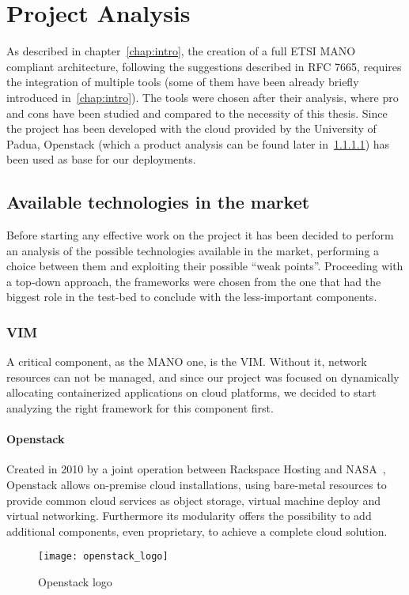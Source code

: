 \chapter{Project Analysis}
\label{chap:prjan}

As described in chapter~\ref{chap:intro}, the creation of a full ETSI MANO
compliant architecture, following the suggestions described in RFC 7665,
requires the integration of multiple tools (some of them have been already
briefly introduced in~\ref{chap:intro}). The tools were chosen after their
analysis, where pro and cons have been studied and compared to the necessity of
this thesis. Since the project has been developed with the cloud provided by the
University of Padua, Openstack (which a product analysis can be found later
in~\ref{chap:prjan:sec:openstack}) has been used as base for our deployments.

\section{Available technologies in the market}
\label{chap:prjan:sec:tech}
Before starting any effective work on the project it has been decided to 
perform an analysis of the possible technologies available in the market, 
performing a choice between them and exploiting their possible ``weak 
points''. Proceeding with a top-down approach, the frameworks were chosen from 
the one that had the biggest role in the test-bed to conclude with the 
less-important components.
\subsection{VIM}
A critical component, as the MANO one, is the VIM. Without it, network resources
can not be managed, and since our project was focused on dynamically allocating
containerized applications on cloud platforms, we decided to start analyzing the
right framework for this component first.

\subsubsection{Openstack}
\label{chap:prjan:sec:openstack}
Created in 2010 by a joint operation between Rackspace Hosting and
NASA~\cite{openstackWebsite}, Openstack allows on-premise cloud installations,
using bare-metal resources to provide common cloud services as object storage,
virtual machine deploy and virtual networking. Furthermore its modularity offers
the possibility to add additional components, even proprietary, to achieve a
complete cloud solution.
\begin{figure}[h]
 \centering \texttt{[image: openstack\_logo]}
 \caption{Openstack logo}
 \label{chap:prjan:img:openstack_logo}
\end{figure}

